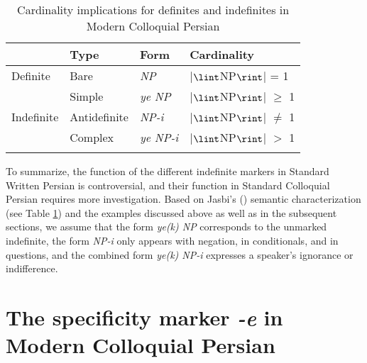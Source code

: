 \documentclass[output=paper]{langsci/langscibook}
\begin{document}
\begin{table}[H]
\centering
\begin{tabular}{llll}
\lsptoprule
 		& Type 	& Form 	& Cardinality \\
\midrule
Definite 	& Bare 	& {\emph{NP}} 	& |$\lint$NP$\rint$| = 1 \\[1mm]
\hdashline
		& Simple		& {\emph{ye NP}}	& |$\lint$NP$\rint$| $\geq$ 1 \\
Indefinite	& Antidefinite 	& {\emph{NP-i}}		& |$\lint$NP$\rint$| $\not=$ 1 \\
		& Complex		& {\emph{ye NP-i}}	& |$\lint$NP$\rint$| $>$ 1 \\
\lspbottomrule
\end{tabular}
\caption{Cardinality implications for definites and indefinites in Modern Colloquial Persian \citep[][251]{jasbi:16}}\label{4table:4}
\end{table}

{
To summarize, the function of the different indefinite markers in Standard Written Persian is controversial, and their function in Standard Colloquial Persian requires more investigation. Based on Jasbi's (\citeyear{jasbi:16}) semantic characterization (see Table \ref{4table:4}) and the examples discussed above as well as in the subsequent sections, we assume that the form {\emph{ye(k) NP}} corresponds to the unmarked indefinite, the form {\emph{NP-i}} only appears with negation, in conditionals, and in questions, and the combined form {\emph{ye(k) NP-i}} expresses a speaker's ignorance or indifference.
}


\section{The specificity marker {\emph{-e}} in Modern Colloquial Persian}\label{4sec:4}
\end{document}
